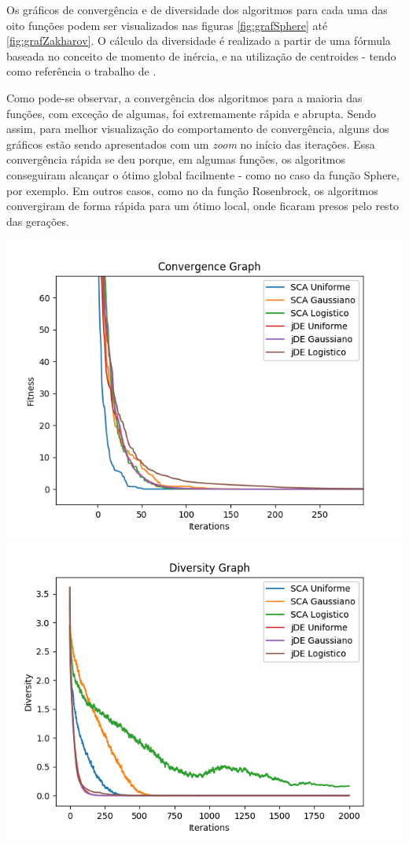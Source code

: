 Os gráficos de convergência e de diversidade dos algoritmos para cada uma das oito funções podem ser visualizados nas figuras \ref{fig:grafSphere} até \ref{fig:grafZakharov}. O cálculo da diversidade é realizado a partir de uma fórmula baseada no conceito de momento de inércia, e na utilização de centroides - tendo como referência o trabalho de \cite{morrison}.

Como pode-se observar, a convergência dos algoritmos para a maioria das funções, com exceção de algumas, foi extremamente rápida e abrupta. Sendo assim, para melhor visualização do comportamento de convergência, alguns dos gráficos estão sendo apresentados com um \textit{zoom} no início das iterações. Essa convergência rápida se deu porque, em algumas funções, os algoritmos conseguiram alcançar o ótimo global facilmente - como no caso da função Sphere, por exemplo. Em outros casos, como no da função Rosenbrock, os algoritmos convergiram de forma rápida para um ótimo local, onde ficaram presos pelo resto das gerações.

{
    \centering
    \includegraphics[width=0.49\linewidth]{figuras/convSphere.png}
    \includegraphics[width=0.49\linewidth]{figuras/divSphere.png}
    \label{fig:grafSphere}
}



